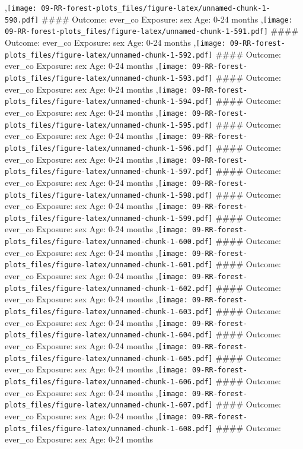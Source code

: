 \documentclass[
  9pt,
]{book}
\begin{document}
,\texttt{[image: 09-RR-forest-plots\_files/figure-latex/unnamed-chunk-1-590.pdf]}
\#\#\#\# Outcome: ever\_co Exposure: sex Age: 0-24 months
,\texttt{[image: 09-RR-forest-plots\_files/figure-latex/unnamed-chunk-1-591.pdf]}
\#\#\#\# Outcome: ever\_co Exposure: sex Age: 0-24 months
,\texttt{[image: 09-RR-forest-plots\_files/figure-latex/unnamed-chunk-1-592.pdf]}
\#\#\#\# Outcome: ever\_co Exposure: sex Age: 0-24 months
,\texttt{[image: 09-RR-forest-plots\_files/figure-latex/unnamed-chunk-1-593.pdf]}
\#\#\#\# Outcome: ever\_co Exposure: sex Age: 0-24 months
,\texttt{[image: 09-RR-forest-plots\_files/figure-latex/unnamed-chunk-1-594.pdf]}
\#\#\#\# Outcome: ever\_co Exposure: sex Age: 0-24 months
,\texttt{[image: 09-RR-forest-plots\_files/figure-latex/unnamed-chunk-1-595.pdf]}
\#\#\#\# Outcome: ever\_co Exposure: sex Age: 0-24 months
,\texttt{[image: 09-RR-forest-plots\_files/figure-latex/unnamed-chunk-1-596.pdf]}
\#\#\#\# Outcome: ever\_co Exposure: sex Age: 0-24 months
,\texttt{[image: 09-RR-forest-plots\_files/figure-latex/unnamed-chunk-1-597.pdf]}
\#\#\#\# Outcome: ever\_co Exposure: sex Age: 0-24 months
,\texttt{[image: 09-RR-forest-plots\_files/figure-latex/unnamed-chunk-1-598.pdf]}
\#\#\#\# Outcome: ever\_co Exposure: sex Age: 0-24 months
,\texttt{[image: 09-RR-forest-plots\_files/figure-latex/unnamed-chunk-1-599.pdf]}
\#\#\#\# Outcome: ever\_co Exposure: sex Age: 0-24 months
,\texttt{[image: 09-RR-forest-plots\_files/figure-latex/unnamed-chunk-1-600.pdf]}
\#\#\#\# Outcome: ever\_co Exposure: sex Age: 0-24 months
,\texttt{[image: 09-RR-forest-plots\_files/figure-latex/unnamed-chunk-1-601.pdf]}
\#\#\#\# Outcome: ever\_co Exposure: sex Age: 0-24 months
,\texttt{[image: 09-RR-forest-plots\_files/figure-latex/unnamed-chunk-1-602.pdf]}
\#\#\#\# Outcome: ever\_co Exposure: sex Age: 0-24 months
,\texttt{[image: 09-RR-forest-plots\_files/figure-latex/unnamed-chunk-1-603.pdf]}
\#\#\#\# Outcome: ever\_co Exposure: sex Age: 0-24 months
,\texttt{[image: 09-RR-forest-plots\_files/figure-latex/unnamed-chunk-1-604.pdf]}
\#\#\#\# Outcome: ever\_co Exposure: sex Age: 0-24 months
,\texttt{[image: 09-RR-forest-plots\_files/figure-latex/unnamed-chunk-1-605.pdf]}
\#\#\#\# Outcome: ever\_co Exposure: sex Age: 0-24 months
,\texttt{[image: 09-RR-forest-plots\_files/figure-latex/unnamed-chunk-1-606.pdf]}
\#\#\#\# Outcome: ever\_co Exposure: sex Age: 0-24 months
,\texttt{[image: 09-RR-forest-plots\_files/figure-latex/unnamed-chunk-1-607.pdf]}
\#\#\#\# Outcome: ever\_co Exposure: sex Age: 0-24 months
,\texttt{[image: 09-RR-forest-plots\_files/figure-latex/unnamed-chunk-1-608.pdf]}
\#\#\#\# Outcome: ever\_co Exposure: sex Age: 0-24 months
\end{document}
